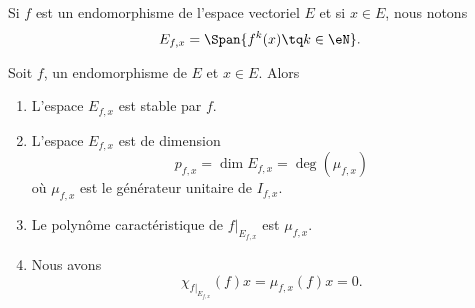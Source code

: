 Si \( f\) est un endomorphisme de l'espace vectoriel \( E\) et si \( x\in E\), nous notons 
\begin{equation}
    E_{f,x}=\Span\{ f^k(x)\tq k\in \eN \}.
\end{equation}

\begin{proposition}\label{PropNrZGhT}
    Soit \( f\), un endomorphisme de \( E\) et \( x\in E\). Alors
    \begin{enumerate}
        \item
            L'espace \( E_{f,x}\) est stable par \( f\).
        \item\label{ItemfzKOCo}
            L'espace \( E_{f,x}\) est de dimension
            \begin{equation}
                p_{f,x}=\dim E_{f,x}=\deg(\mu_{f,x})
            \end{equation}
            où \( \mu_{f,x}\) est le générateur unitaire de \( I_{f,x}\).
        \item   \label{ItemKHNExH}
            Le polynôme caractéristique de \( f|_{E_{f,x}}\) est \( \mu_{f,x}\).
        \item   \label{ItemHMviZw}
            Nous avons
            \begin{equation}
                \chi_{f|_{E_{f,x}}}(f)x=\mu_{f,x}(f)x=0.
            \end{equation}
    \end{enumerate}
\end{proposition}

